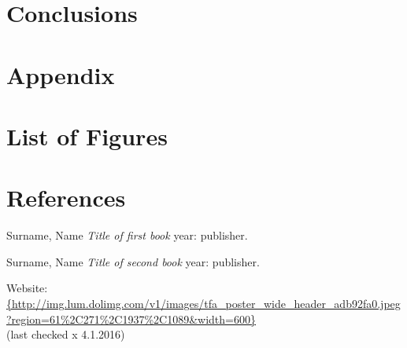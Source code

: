 \documentclass[12pt,a4paper]{article} %
\begin{document}
\section{Conclusions}
\newpage




\appendix
\section{Appendix}
\newpage





\section{List of Figures}
\listoffigures



\newpage
\section{References}

\begin{thebibliography}{1} 



 Surname, Name {\em Title of first book} year: publisher.

 Surname, Name {\em Title of second book} year: publisher.

 Website: \url{{http://img.lum.dolimg.com/v1/images/tfa_poster_wide_header_adb92fa0.jpeg?region=61%2C271%2C1937%2C1089&width=600}} 
\\(last checked x 4.1.2016)


\end{thebibliography}
\end{document}
